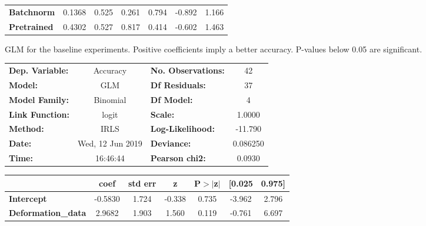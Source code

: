 \begin{figure}[!htb]
\begin{center}
\begin{tabular}{lcccccc}
			\textbf{Batchnorm}     &       0.1368  &        0.525     &     0.261  &         0.794        &       -0.892    &        1.166     \\
			\textbf{Pretrained}    &       0.4302  &        0.527     &     0.817  &         0.414        &       -0.602    &        1.463     \\
			\bottomrule
		\end{tabular}
	\end{center}
	\caption{GLM for the baseline experiments. Positive coefficients imply a better accuracy. P-values below 0.05 are significant.}
	\label{fig:GLM_baseline}
\end{figure}

\begin{figure}[!htb]
	\centering
	\begin{center}
		\begin{tabular}{lclc}
			\toprule
			\textbf{Dep. Variable:}    &     Accuracy     & \textbf{  No. Observations:  } &       42    \\
			\textbf{Model:}            &       GLM        & \textbf{  Df Residuals:      } &       37    \\
			\textbf{Model Family:}     &     Binomial     & \textbf{  Df Model:          } &        4    \\
			\textbf{Link Function:}    &      logit       & \textbf{  Scale:             } &    1.0000   \\
			\textbf{Method:}           &       IRLS       & \textbf{  Log-Likelihood:    } &   -11.790   \\
			\textbf{Date:}             & Wed, 12 Jun 2019 & \textbf{  Deviance:          } &  0.086250   \\
			\textbf{Time:}             &     16:46:44     & \textbf{  Pearson chi2:      } &   0.0930    \\
			\bottomrule
		\end{tabular}
		\begin{tabular}{lcccccc}
			& \textbf{coef} & \textbf{std err} & \textbf{z} & \textbf{P$>$$|$z$|$} & \textbf{[0.025} & \textbf{0.975]}  \\
			\midrule
			\textbf{Intercept}         &      -0.5830  &        1.724     &    -0.338  &         0.735        &       -3.962    &        2.796     \\
			\textbf{Deformation\_data} &       2.9682  &        1.903     &     1.560  &         0.119        &       -0.761    &        6.697     \\

\end{tabular}
\end{center}
\end{figure}
